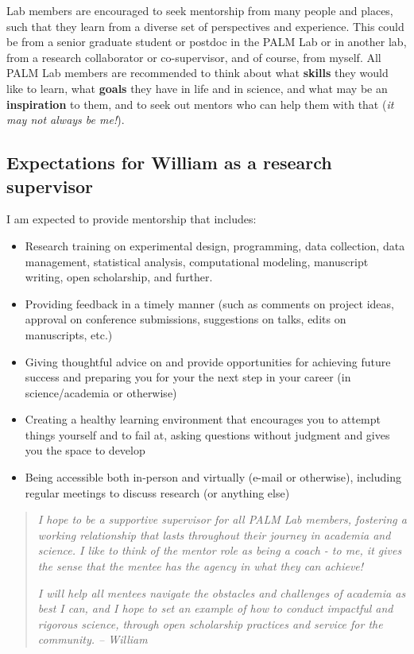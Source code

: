 \documentclass[
]{book}
\providecommand{\tightlist}{%
  \setlength{\itemsep}{0pt}\setlength{\parskip}{0pt}}
\begin{document}
Lab members are encouraged to seek mentorship from many people and places, such that they learn from a diverse set of perspectives and experience. This could be from a senior graduate student or postdoc in the PALM Lab or in another lab, from a research collaborator or co-supervisor, and of course, from myself. All PALM Lab members are recommended to think about what \textbf{skills} they would like to learn, what \textbf{goals} they have in life and in science, and what may be an \textbf{inspiration} to them, and to seek out mentors who can help them with that (\emph{it may not always be me!}).

\hypertarget{will-mentor}{%
\subsection{Expectations for William as a research supervisor}\label{will-mentor}}

I am expected to provide mentorship that includes:

\begin{itemize}
\tightlist
\item
  Research training on experimental design, programming, data collection, data management, statistical analysis, computational modeling, manuscript writing, open scholarship, and further.
\item
  Providing feedback in a timely manner (such as comments on project ideas, approval on conference submissions, suggestions on talks, edits on manuscripts, etc.)
\item
  Giving thoughtful advice on and provide opportunities for achieving future success and preparing you for your the next step in your career (in science/academia or otherwise)
\item
  Creating a healthy learning environment that encourages you to attempt things yourself and to fail at, asking questions without judgment and gives you the space to develop
\item
  Being accessible both in-person and virtually (e-mail or otherwise), including regular meetings to discuss research (or anything else)
\end{itemize}

\begin{quote}
\emph{I hope to be a supportive supervisor for all PALM Lab members, fostering a working relationship that lasts throughout their journey in academia and science. I like to think of the mentor role as being a coach - to me, it gives the sense that the mentee has the agency in what they can achieve!}

\emph{I will help all mentees navigate the obstacles and challenges of academia as best I can, and I hope to set an example of how to conduct impactful and rigorous science, through open scholarship practices and service for the community. -- William}
\end{quote}
\end{document}
